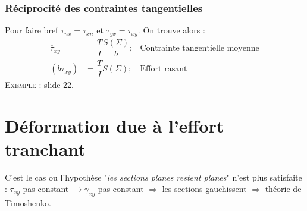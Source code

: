 		\subsubsection{Réciprocité des contraintes tangentielles}
		Pour faire bref $\tau_{nx} = \tau_{xn}$ et $\tau_{yx}=\tau_{xy}$. On 
		trouve alors :
		\begin{equation}
		\begin{array}{lll}
		\overline{\tau}_{xy} &= \dfrac{T}{I}\dfrac{S(\Sigma)}{b}; & \text{Contrainte 
		tangentielle moyenne}\\
		(b\overline{\tau}_{xy}) &= \dfrac{T}{I}S(\Sigma); & \text{Effort rasant}
		\end{array}
		\end{equation}		
		\textsc{Exemple :} slide 22.
	
	
\section{Déformation due à l'effort tranchant}
C'est le cas ou l'hypothèse "\textit{les sections planes restent planes}" n'est plus 
satisfaite : $\tau_{xy}$ pas constant $\rightarrow \gamma_{xy}$ pas constant $\Rightarrow 
$ les sections gauchissent $\Rightarrow$ théorie de Timoshenko.
	
	